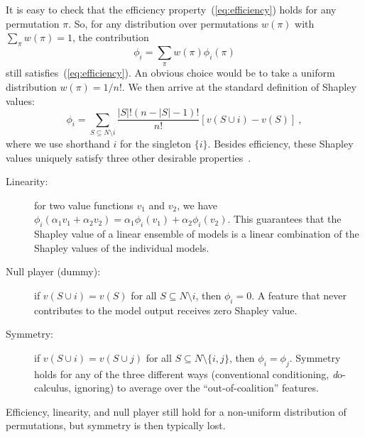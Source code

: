 \documentclass{article}
\newcommand{\vX}{\mathbf{X}}
\newcommand{\vx}{\mathbf{x}}
\newcommand{\expectation}{\mathbb{E}}
\newcommand{\contribution}{{\phi}}
\newcommand{\val}{{v}}
\newcommand{\perm}{\pi}
\newcommand{\operator}{\mathit{op}}
\newcommand{\svop}[1]{\operator(\vx_{#1})}
\newcommand{\allfeatures}{{N}}
\begin{document}
It is easy to check that the efficiency property~(\ref{eq:efficiency}) holds for any permutation $\perm$.
So, for any distribution over permutations $w(\perm)$ with $\sum_{\perm} w(\perm) = 1$, the contribution
\[
\contribution_i = \sum_{\perm} w(\perm) \contribution_i(\perm)
\]
still satisfies~(\ref{eq:efficiency}). An obvious choice would be to take a uniform distribution $w(\perm) = 1/n!$. We then arrive at the standard definition of Shapley values:
\[
\contribution_i = \sum_{S \subseteq \allfeatures\setminus i} \frac{|S|! (n-|S|-1)!}{n!} \left[\val(S \cup i) - \val(S) \right] \: ,
\]
where we use shorthand $i$ for the singleton $\{i\}$. Besides efficiency, these Shapley values uniquely satisfy three other desirable properties~\cite{shapley1953value}.
\begin{description}
	\item[Linearity:] for two value functions $\val_1$ and $\val_2$, we have $\contribution_i(\alpha_1 \val_1 + \alpha_2 \val_2) = \alpha_1 \contribution_i(\val_1) + \alpha_2 \contribution_i(\val_2)$. This guarantees that the Shapley value of a linear ensemble of models is a linear combination of the Shapley values of the individual models.
	\item[Null player (dummy):] if $\val(S \cup i) = \val(S)$ for all $S \subseteq \allfeatures \setminus i$, then $\contribution_i = 0$. A feature that never contributes to the model output receives zero Shapley value.
	\item[Symmetry:] if $\val(S \cup i) = \val(S \cup j)$ for all  $S \subseteq \allfeatures \setminus \{i,j\}$, then $\contribution_i = \contribution_j$. Symmetry holds for any of the three different ways (conventional conditioning, {\textit do}-calculus, ignoring) to average over the ``out-of-coalition'' features.
\end{description}
Efficiency, linearity, and null player still hold for a non-uniform distribution of permutations, but symmetry is then typically lost. 
\end{document}
